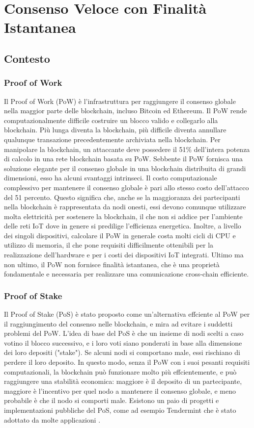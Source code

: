 \section{Consenso Veloce con Finalità Istantanea}

\subsection{Contesto}

\subsubsection{Proof of Work}
Il Proof of Work (PoW) è l'infrastruttura per raggiungere il consenso globale nella maggior parte delle blockchain, incluso Bitcoin ed Ethereum. Il PoW rende computazionalmente difficile costruire un blocco valido e collegarlo alla blockchain. Più lunga diventa la blockchain, più difficile diventa annullare qualunque transazione precedentemente archiviata nella blockchain. Per manipolare la blockchain, un attaccante deve possedere il 51\% dell'intera potenza di calcolo in una rete blockchain basata su PoW.
Sebbente il PoW fornisca una soluzione elegante per il consenso globale in una blockchain distribuita di grandi dimensioni, esso ha alcuni svantaggi intrinseci. Il costo computazionale complessivo per mantenere il consenso globale è pari allo stesso costo dell'attacco del 51 percento. Questo significa che, anche se la maggioranza dei partecipanti nella blockchain è rappresentata da nodi onesti, essi devono comunque utilizzare molta elettricità per sostenere la blockchain, il che non si addice per l'ambiente delle reti IoT dove in genere si predilige l'efficienza energetica. Inoltre, a livello dei singoli dispositivi, calcolare il PoW in generale costa molti cicli di CPU e utilizzo di memoria, il che pone requisiti difficilmente ottenibili per la realizzazione dell'hardware e per i costi dei dispositivi IoT integrati. Ultimo ma non ultimo, il PoW non fornisce finalità istantanea, che è una proprietà fondamentale e necessaria per realizzare una comunicazione cross-chain efficiente.

\subsubsection{Proof of Stake}
Il Proof of Stake (PoS) è stato proposto come un'alternativa effciente al PoW per il raggiungimento del consenso nelle blockchain, e mira ad evitare i suddetti problemi del PoW. L'idea di base del PoS è che un insieme di nodi scelti a caso votino il blocco successivo, e i loro voti siano ponderati in base alla dimensione dei loro depositi ("stake"). Se alcuni nodi si comportano male, essi rischiano di perdere il loro deposito. In questo modo, senza il PoW con i suoi pesanti requisiti computazionali, la blockchain può funzionare molto più effcientemente, e può raggiungere una stabilità economica: maggiore è il deposito di un partecipante, maggiore è l'incentivo per quel nodo a mantenere il consenso globale, e meno probabile è che il nodo si comporti male. Esistono un paio di progetti e implementazioni pubbliche del PoS, come ad esempio Tendermint \cite{c32} che è stato adottato da molte applicazioni \cite{c33}.

